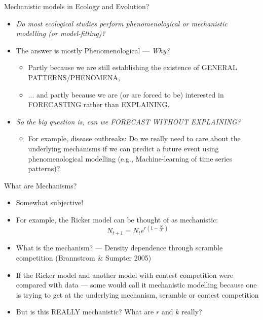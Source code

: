 \documentclass[xcolor=x11names,compress]{beamer}
\renewcommand{\(}{\begin{columns}}
\renewcommand{\)}{\end{columns}}
\newcommand{\<}[1]{\begin{column}{#1}}
\renewcommand{\>}{\end{column}}
\begin{document}
\begin{frame}{Mechanistic models in Ecology and Evolution?}

\begin{itemize}[<+->] \itemsep12pt
	\item \it Do most ecological studies perform phenomenological or mechanistic modelling (or model-fitting)?
	
	\item The answer is mostly Phenomenological \pause --- {\it Why?} \pause
	\begin{itemize}
		\item Partly because we are still establishing the existence of GENERAL PATTERNS/PHENOMENA,
		\item  ... and partly because we are (or are forced to be) interested in FORECASTING rather than EXPLAINING. 
 
	\end{itemize}	  
	
	\item {\it So the big question is, can we FORECAST WITHOUT EXPLAINING?}
	
	\begin{itemize}
		\item For example, disease outbreaks: Do we really need to care about the underlying mechanisms if we can predict a future event using phenomenological modelling (e.g., Machine-learning of time series patterns)?
		
	\end{itemize}

\end{itemize}

\end{frame}

\begin{frame}{What are Mechanisms?}

   \begin{itemize}[<+->] \itemsep4pt{}
			\item Somewhat subjective! 
			\item For example, the Ricker model can be thought of as 
			mechanistic:
			$$ 
				N_{t+1} = N_t e^{r\left(1-\frac{N_t}{k}\right)} 
			$$ 
				
			\item What is the mechanism? \pause --- Density dependence through scramble competition (Brannstrom \& Sumpter 2005)

			\item If the Ricker model and another model with contest 
			competition were compared with data --- some would call it mechanistic  modelling because one is trying to get at the underlying mechanism, scramble or contest competition
			
			\item But is this REALLY mechanistic? What are $r$ and $k$ really?
   \end{itemize}

\end{frame}
\end{document}
